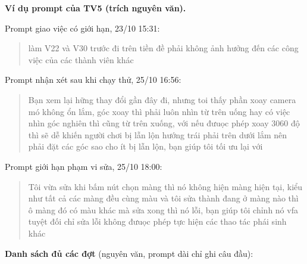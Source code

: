 \textbf{Ví dụ prompt của TV5 (trích nguyên văn).}

Prompt giao việc có giới hạn, 23/10 15:31:

\begin{quote}
làm V22 và V30 trước đi trên tiền đề phải không ảnh hưởng đến các công việc của các thành viên khác
\end{quote}

Prompt nhận xét sau khi chạy thử, 25/10 16:56:

\begin{quote}
Bạn xem lại hững thay đổi gần đây đi, nhưng toi thấy phần xoay camera mó không ổn lắm, góc xoay thì phải luôn nhìn từ trên uống hay có việc nhìn góc nghiên thì cũng từ trên xuống, với nếu đưuọc phép xoay 3060 độ thì sẽ dễ khiến người chơi bị lẫn lộn hướng trái phải trên dưới lắm nên phải đặt các góc sao cho ít bị lẫn lộn, bạn giúp tôi tối ưu lại với
\end{quote}

Prompt giới hạn phạm vi sửa, 25/10 18:00:

\begin{quote}
Tôi vừa sửa khi bấm nút chọn màng thì nó không hiện màng hiện tại, kiểu như tất cả các màng đều cùng màu và tôi sửa thành đang ở màng nào thì ô màng đó có màu khác mà sửa xong thì nó lỗi, bạn giúp tôi chỉnh nó vfa tuyệt đối chỉ sửa lỗi không đưuọc phép tực hiện các thao tác phái sinh khác
\end{quote}

\textbf{Danh sách đủ các đợt} (nguyên văn, prompt dài chỉ ghi câu đầu):


